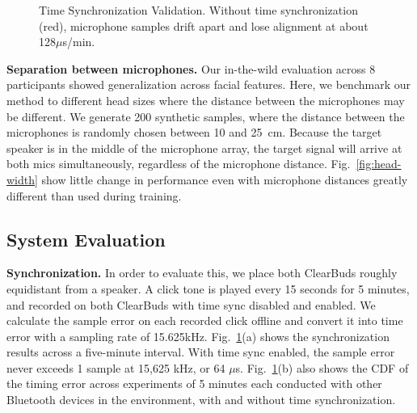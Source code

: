 \documentclass [11pt, proquest] {uwthesis}[2020/02/24]
\begin{document}
\begin{figure}
\centering     %
{}%
\vskip -0.15in
\caption{Time Synchronization Validation.  Without time synchronization (red), microphone samples drift apart and lose alignment at about 128$\mu$s/min.} %
\label{fig:sync}
\vskip -0.2in
\end{figure}

{\bf Separation between microphones.} Our in-the-wild evaluation across 8 participants showed  generalization across facial features. Here, we  benchmark our method  to different head sizes where the distance between the microphones may be different. We generate 200 synthetic samples, where the distance between the microphones is randomly chosen between 10 and 25~cm. Because the target speaker is in the middle of the microphone array, the target signal will arrive at both mics simultaneously, regardless of the microphone distance.  Fig.~\ref{fig:head-width} show little change in performance even with microphone distances greatly different than used during training.




\subsection{System   Evaluation}
{\bf Synchronization.}  In order to evaluate this, we place both ClearBuds roughly equidistant from a speaker. A {click tone} is played every 15 seconds for 5 minutes, and recorded on both ClearBuds with time sync disabled and enabled. We calculate the sample error on each recorded click offline and convert it into time error with a sampling rate of 15.625kHz.
Fig.~\ref{fig:sync}(a) shows the synchronization  results across a five-minute interval. With time sync enabled, the sample error never exceeds 1 sample at 15,625 kHz, or 64 $\mu$s. Fig.~\ref{fig:sync}(b) also shows the CDF of the timing error across  experiments of 5 minutes each conducted with other Bluetooth devices in the environment,  with and without time synchronization.  
\end{document}
